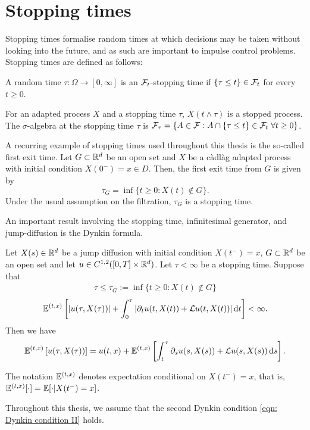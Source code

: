 \section{Stopping times}
\label{section: Stopping times}
Stopping times formalise random times at which decisions may be taken without looking into the future, and as such are important to impulse control problems. Stopping times are defined as follows:
\begin{definition}
    A random time $\tau: \Omega \rightarrow [0,\infty]$ is an $\mathcal{F}_t$-stopping time if \newline $\{\tau \leq t\} \in \mathcal{F}_t$ for every $t \geq 0$. 
\end{definition}
For an adapted process $X$ and a stopping time $\tau$, $X(t \wedge \tau)$ is a stopped process. The $\sigma$-algebra at the stopping time $\tau$ is $\mathcal{F}_\tau = \{A \in \mathcal{F}: A \cap \{\tau \leq t\} \in \mathcal{F}_t \; \forall t \geq 0\}$. 
\begin{example}
    A recurring example of stopping times used throughout this thesis is the so-called first exit time. Let $G \subset \mathbb{R}^d$ be an open set and $X$ be a càdlàg adapted process with initial condition $X(0^-)=x \in D$. Then, the first exit time from $G$ is given by 
    \begin{equation*}
        \tau_G = \inf\{t \geq 0: X(t) \notin G\}. 
    \end{equation*}
    Under the usual assumption on the filtration, $\tau_G$ is a stopping time. 
\end{example}

An important result involving the stopping time, infinitesimal generator, and jump-diffusion is the Dynkin formula. 
\begin{theorem}
\label{trm: Dynkin formula}
    Let $X(s) \in \mathbb{R}^d$ be a jump diffusion with initial condition $X(t^-)=x$, $G \subset \mathbb{R}^d$ be an open set and let $u \in C^{1,2}([0,T] \times \mathbb{R}^d)$. Let $\tau < \infty$ be a stopping time. Suppose that 
    \begin{align*}
        \tau \leq \tau_G := \inf \{t\geq 0: X(t) \notin G\}
    \end{align*}
    \begin{align}
        \mathbb{E}^{(t,x)} \left[ |u(\tau, X(\tau))| + \int_0^\tau |\partial_t u(t,X(t)) + \mathcal{L} u(t,X(t))| \,\mathrm{d} t\right] < \infty. 
        \label{eqn: Dynkin condition II}
    \end{align}
    Then we have
    \begin{equation*}
        \mathbb{E}^{(t,x)} \left[ u(\tau,X(\tau)) \right] = u(t,x) + \mathbb{E}^{(t,x)} \left[\int_t^\tau \partial_s u(s,X(s)) + \mathcal{L} u(s,X(s)) \,\mathrm{d} s \right].
    \end{equation*}
\end{theorem}
\begin{remark}
    The notation $\mathbb{E}^{(t,x)}$ denotes expectation conditional on $X(t^-)=x$, that is,  $\mathbb{E}^{(t,x)}[\cdot] = \mathbb{E}[\cdot | X(t^-) = x]$. 
\end{remark}
Throughout this thesis, we assume that the second Dynkin condition \eqref{eqn: Dynkin condition II} holds. 

